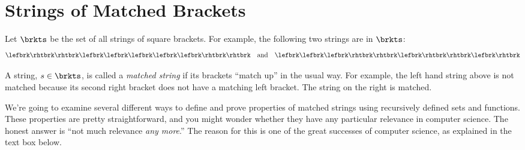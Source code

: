 \begin{problems}
\practiceproblems
{}

\classproblems
{}

\homeworkproblems
{}

\examproblems
{}

\end{problems}

\section{Strings of Matched Brackets}

Let $\brkts$ be the set of all strings of square brackets.  For example,
the following two strings are in $\brkts$:
\begin{equation}\label{2strings}
\lefbrk\rhtbrk\rhtbrk\lefbrk\lefbrk\lefbrk\lefbrk\lefbrk\rhtbrk\rhtbrk\quad \text{and}\quad \lefbrk\lefbrk\lefbrk\rhtbrk\rhtbrk\lefbrk\rhtbrk\rhtbrk\lefbrk\rhtbrk
\end{equation}

A string, $s \in \brkts$, is called a \emph{matched string} if its
brackets ``match up'' in the usual way.  For example, the left hand
string above is not matched because its second right bracket does not
have a matching left bracket.  The string on the right is matched.

We're going to examine several different ways to define and prove
properties of matched strings using recursively defined sets and
functions.  These properties are pretty straightforward, and you might
wonder whether they have any particular relevance in computer science.
The honest answer is ``not much relevance \emph{any more}.''  The reason
for this is one of the great successes of computer science, as explained in
the text box below.


